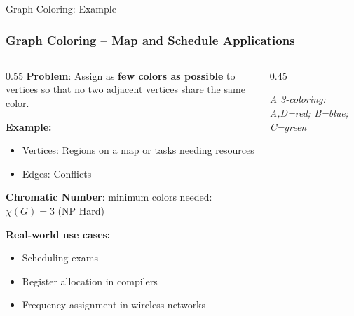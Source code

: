 \documentclass{beamer}
\begin{document}
\begin{frame}{Graph Coloring: Example}
\frametitle{Graph Coloring – Map and Schedule Applications}
\small

\begin{columns}
\begin{column}{0.55\textwidth}
\textbf{Problem}: Assign as {\bf few colors as possible} to vertices so that no two adjacent vertices share the same color.

\vspace{1em}
\textbf{Example:}
\begin{itemize}
\item Vertices: Regions on a map or tasks needing resources
    \item Edges: Conflicts 
\end{itemize}
\textbf{Chromatic Number}: minimum colors needed: \alert{$\chi(G) = 3$} (NP Hard)
\vspace{1em}

\textcolor{new_turquoise}{\bf Real-world use cases:}
\begin{itemize}
    \item Scheduling exams
    \item Register allocation in compilers
    \item Frequency assignment in wireless networks
\end{itemize}
\end{column}

\begin{column}{0.45\textwidth}
\begin{center}
\end{center}
\footnotesize\textit{A 3-coloring: A,D=red; B=blue; C=green}
\end{column}
\end{columns}
\end{frame}
\end{document}
